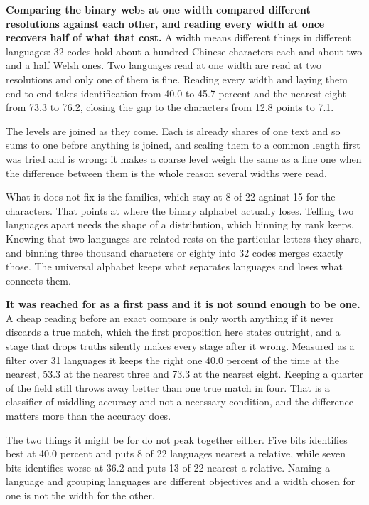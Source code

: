 \textbf{Comparing the binary webs at one width compared different resolutions against each other, and reading every width at once recovers half of what that cost.} A width means different things in different languages: 32 codes hold about a hundred Chinese characters each and about two and a half Welsh ones. Two languages read at one width are read at two resolutions and only one of them is fine. Reading every width and laying them end to end takes identification from 40.0 to 45.7 percent and the nearest eight from 73.3 to 76.2, closing the gap to the characters from 12.8 points to 7.1.

The levels are joined as they come. Each is already shares of one text and so sums to one before anything is joined, and scaling them to a common length first was tried and is wrong: it makes a coarse level weigh the same as a fine one when the difference between them is the whole reason several widths were read.

What it does not fix is the families, which stay at 8 of 22 against 15 for the characters. That points at where the binary alphabet actually loses. Telling two languages apart needs the shape of a distribution, which binning by rank keeps. Knowing that two languages are related rests on the particular letters they share, and binning three thousand characters or eighty into 32 codes merges exactly those. The universal alphabet keeps what separates languages and loses what connects them.

\textbf{It was reached for as a first pass and it is not sound enough to be one.} A cheap reading before an exact compare is only worth anything if it never discards a true match, which the first proposition here states outright, and a stage that drops truths silently makes every stage after it wrong. Measured as a filter over 31 languages it keeps the right one 40.0 percent of the time at the nearest, 53.3 at the nearest three and 73.3 at the nearest eight. Keeping a quarter of the field still throws away better than one true match in four. That is a classifier of middling accuracy and not a necessary condition, and the difference matters more than the accuracy does.

The two things it might be for do not peak together either. Five bits identifies best at 40.0 percent and puts 8 of 22 languages nearest a relative, while seven bits identifies worse at 36.2 and puts 13 of 22 nearest a relative. Naming a language and grouping languages are different objectives and a width chosen for one is not the width for the other.


